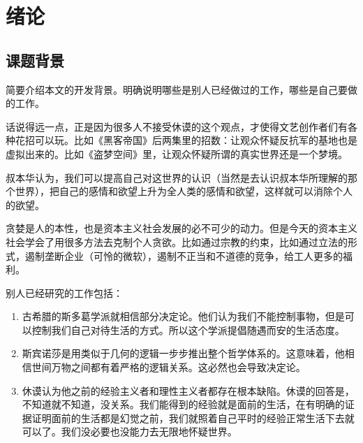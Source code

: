 
\clearpage
\setcounter{page}{1} 

\chapter{绪论}

\section{课题背景}\label{sec:background}
简要介绍本文的开发背景。明确说明哪些是别人已经做过的工作，哪些是自己要做的工作。

话说得远一点，正是因为很多人不接受休谟的这个观点，才使得文艺创作者们有各种花招可以玩。比如《黑客帝国》后两集里的招数：让观众怀疑反抗军的基地也是虚拟出来的。比如《盗梦空间》里，让观众怀疑所谓的真实世界还是一个梦境。

叔本华认为，我们可以提高自己对这世界的认识（当然是去认识叔本华所理解的那个世界），把自己的感情和欲望上升为全人类的感情和欲望，这样就可以消除个人的欲望\cite{chen2005laser}。

贪婪是人的本性，也是资本主义社会发展的必不可少的动力。但是今天的资本主义社会学会了用很多方法去克制个人贪欲。比如通过宗教的约束，比如通过立法的形式，遏制垄断企业（可怜的微软），遏制不正当和不道德的竞争，给工人更多的福利\cite{chen2005laser, mittelbach2004latex, zhen2018leave}。

别人已经研究的工作包括：
\begin{enumerate}
	\item 古希腊的斯多葛学派就相信部分决定论。他们认为我们不能控制事物，但是可以控制我们自己对待生活的方式。所以这个学派提倡随遇而安的生活态度\cite{zhou2002nerualnet}。
	\item 斯宾诺莎是用类似于几何的逻辑一步步推出整个哲学体系的。这意味着，他相信世间万物之间都有着严格的逻辑关系。这必然也会导致决定论\cite{qi2020deeplearning}。
	\item 休谟认为他之前的经验主义者和理性主义者都存在根本缺陷。休谟的回答是，不知道就不知道，没关系。我们能得到的经验就是面前的生活，在有明确的证据证明面前的生活都是幻觉之前，我们就照着自己平时的经验正常生活下去就可以了。我们没必要也没能力去无限地怀疑世界\cite{partl2019short}。
\end{enumerate}

